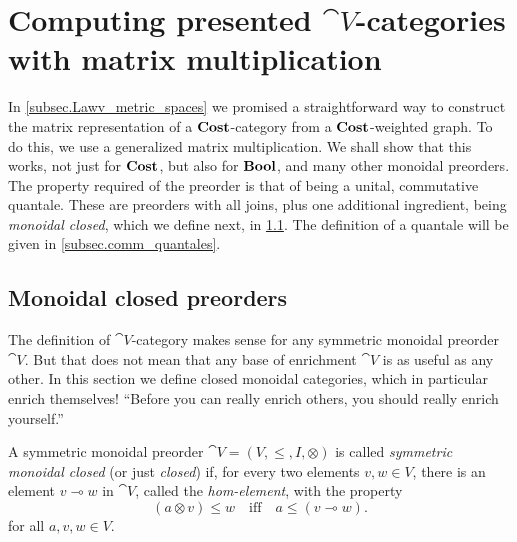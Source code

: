 \documentclass[7Sketches]{subfiles}
\begin{document}
\section[Computing presented $\cat{V}$-categories with matrix mult.]{Computing presented $\cat{V}$-categories with matrix multiplication}
%
\label{sec.quantales}%
In \cref{subsec.Lawv_metric_spaces} we promised a straightforward way to
construct the matrix representation of a $\mathbf{Cost}$-category from a
$\mathbf{Cost}$-weighted graph.  To do this, we use a generalized matrix multiplication.
We shall show that this works, not just for $\mathbf{Cost}$, but also for $\mathbf{Bool}$, and
many other monoidal preorders. The property required of the preorder is that
of being a unital, commutative quantale. These are preorders with all joins,
plus one additional ingredient, being \emph{monoidal closed}, which we define
next, in \cref{subsec.mon_closed_preorder}. The definition of a quantale will be
given in \cref{subsec.comm_quantales}.

%
\subsection{Monoidal closed preorders}%
\label{subsec.mon_closed_preorder}

The definition of $\cat{V}$-category makes sense for any symmetric monoidal
preorder $\cat{V}$. But that does not mean that any base of enrichment $\cat{V}$
is as useful as any other. In this section we define closed monoidal categories,
which in particular enrich themselves! ``Before you can really enrich others,
you should really enrich yourself.''

\begin{definition}%
\label{def.monoidal_closed}%
%
A symmetric monoidal preorder $\cat{V}=(V,\leq,I,\otimes)$ is called \emph{symmetric monoidal closed} (or just \emph{closed}) if, for every two elements $v,w\in V$, there is an element $v\multimap w$ in $\cat{V}$, called the \emph{hom-element}, with the property
\begin{equation}%
\label{eqn.monoidal_closed_adj}
	(a\otimes v)\leq w\quad\text{iff}\quad a\leq (v\multimap w).
\end{equation}
for all $a,v,w\in V$.
\end{definition}
\end{document}
